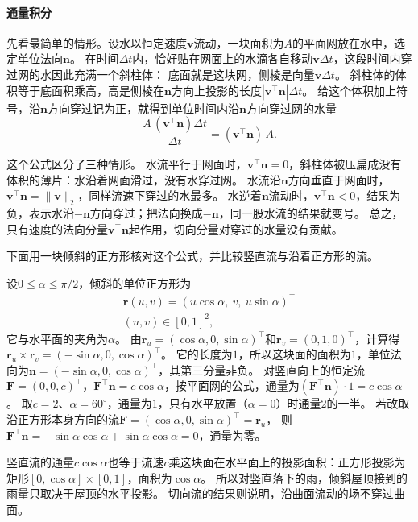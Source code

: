 \paragraph{通量积分}

先看最简单的情形。设水以恒定速度$\bm v$流动，一块面积为$A$的平面网放在水中，选定单位法向$\bm n$。
在时间$\Delta t$内，恰好贴在网面上的水滴各自移动$\bm v\Delta t$，这段时间内穿过网的水因此充满一个斜柱体：
底面就是这块网，侧棱是向量$\bm v\Delta t$。
斜柱体的体积等于底面积乘高，高是侧棱在$\bm n$方向上投影的长度$|\bm v^\top\bm n|\Delta t$。
给这个体积加上符号，沿$\bm n$方向穿过记为正，就得到单位时间内沿$\bm n$方向穿过网的水量
\[
 \frac{A\,(\bm v^\top\bm n)\Delta t}{\Delta t}=(\bm v^\top\bm n)\,A.
\]

这个公式区分了三种情形。
水流平行于网面时，$\bm v^\top\bm n=0$，斜柱体被压扁成没有体积的薄片：水沿着网面滑过，没有水穿过网。
水流沿$\bm n$方向垂直于网面时，$\bm v^\top\bm n=\lVert\bm v\rVert_2$，同样流速下穿过的水最多。
水逆着$\bm n$流动时，$\bm v^\top\bm n<0$，结果为负，表示水沿$-\bm n$方向穿过；把法向换成$-\bm n$，同一股水流的结果就变号。
总之，只有速度的法向分量$\bm v^\top\bm n$起作用，切向分量对穿过的水量没有贡献。

下面用一块倾斜的正方形核对这个公式，并比较竖直流与沿着正方形的流。

\begin{example}[竖直流与切向流穿过倾斜正方形]
\label{ex:analysis-tilted-square-flux}
设$0\leq\alpha\leq\pi/2$，倾斜的单位正方形为
\[
\begin{gathered}
\bm r(u,v)=(u\cos\alpha,\ v,\ u\sin\alpha)^\top\\
(u,v)\in[0,1]^2,
\end{gathered}
\]
它与水平面的夹角为$\alpha$。
由$\bm r_u=(\cos\alpha,0,\sin\alpha)^\top$和$\bm r_v=(0,1,0)^\top$，计算得$\bm r_u\times\bm r_v=(-\sin\alpha,0,\cos\alpha)^\top$。
它的长度为$1$，所以这块面的面积为$1$，单位法向为$\bm n=(-\sin\alpha,0,\cos\alpha)^\top$，其第三分量非负。
对竖直向上的恒定流$\bm F=(0,0,c)^\top$，$\bm F^\top\bm n=c\cos\alpha$，按平面网的公式，通量为$(\bm F^\top\bm n)\cdot1=c\cos\alpha$。
取$c=2$、$\alpha=60^\circ$，通量为$1$，只有水平放置（$\alpha=0$）时通量$2$的一半。
若改取沿正方形本身方向的流$\bm F=(\cos\alpha,0,\sin\alpha)^\top=\bm r_u$，
则$\bm F^\top\bm n=-\sin\alpha\cos\alpha+\sin\alpha\cos\alpha=0$，通量为零。
\end{example}

竖直流的通量$c\cos\alpha$也等于流速$c$乘这块面在水平面上的投影面积：正方形投影为矩形$[0,\cos\alpha]\times[0,1]$，面积为$\cos\alpha$。
所以对竖直落下的雨，倾斜屋顶接到的雨量只取决于屋顶的水平投影。
切向流的结果则说明，沿曲面流动的场不穿过曲面。

